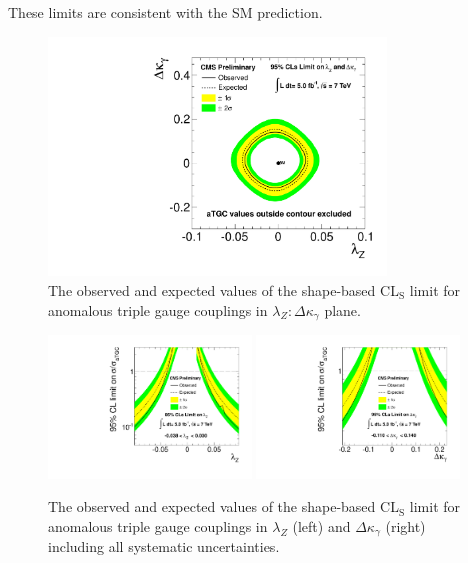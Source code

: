 These limits are consistent with the SM prediction. 
\begin{figure}[bthp]
\includegraphics[width=0.8\textwidth]{figs/lz_dkg_2dlimit.pdf}
\caption{\label{fig:limitshape2d}
The observed and expected values of the shape-based  CL${}_{\textrm{S}}$ limit for 
anomalous triple gauge couplings in $\lambda_Z:\Delta{\kappa_\gamma}$ plane.
}
\end{figure}
\begin{figure}[bthp]
\includegraphics[width=0.48\textwidth]{figs/lz_1dlimit.pdf}
\includegraphics[width=0.48\textwidth]{figs/dkg_1dlimit.pdf}
\caption{\label{fig:limitshape1d}
The observed and expected values of the shape-based  CL${}_{\textrm{S}}$ limit for 
anomalous triple gauge couplings in $\lambda_Z$ (left) and $\Delta{\kappa_\gamma}$ (right)
including all systematic uncertainties.
}
\end{figure}


